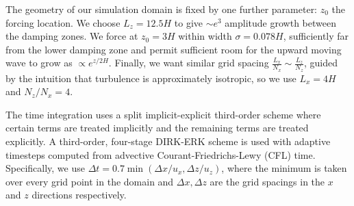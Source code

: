 \documentclass[
        fleqn,
        usenatbib,
        referee,
    ]{mnras}
\begin{document}
The geometry of our simulation domain is fixed by one further parameter: $z_0$
the forcing location. We choose $L_z = 12.5H$ to give $\sim e^3$ amplitude growth
between the damping zones. We force at $z_0 = 3H$ within width $\sigma =
0.078H$, sufficiently far from the lower damping zone and permit sufficient room
for the upward moving wave to grow as $\propto e^{z/2H}$. Finally, we want
similar grid spacing $\frac{L_x}{N_x} \sim \frac{L_z}{N_z}$, guided by the
intuition that turbulence is approximately isotropic, so we use $L_x = 4H$ and
$N_z / N_x = 4$.

The time integration uses a split implicit-explicit third-order scheme where
certain terms are treated implicitly and the remaining terms are treated
explicitly. A third-order, four-stage DIRK-ERK scheme \citep{ascher} is used
with adaptive timesteps computed from advective Courant-Friedrichs-Lewy (CFL)
time. Specifically, we use $\Delta t = 0.7 \min(\Delta x / u_x,\Delta z /
u_{z})$, where the minimum is taken over every grid point in the domain and
$\Delta x,\Delta z$ are the grid spacings in the $x$ and $z$ directions
respectively.
\end{document}
